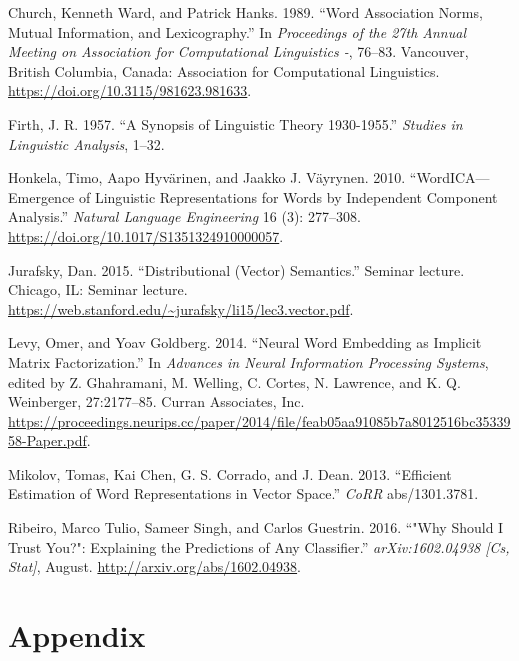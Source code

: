 \documentclass{article}
\begin{document}
\leavevmode\hypertarget{ref-church_word_1989}{}%
Church, Kenneth Ward, and Patrick Hanks. 1989. ``Word Association Norms,
Mutual Information, and Lexicography.'' In \emph{Proceedings of the 27th
Annual Meeting on Association for Computational Linguistics -}, 76--83.
Vancouver, British Columbia, Canada: Association for Computational
Linguistics. \url{https://doi.org/10.3115/981623.981633}.

\leavevmode\hypertarget{ref-firth_synopsis_1957}{}%
Firth, J. R. 1957. ``A Synopsis of Linguistic Theory 1930-1955.''
\emph{Studies in Linguistic Analysis}, 1--32.

\leavevmode\hypertarget{ref-honkela_wordicaemergence_2010}{}%
Honkela, Timo, Aapo Hyvärinen, and Jaakko J. Väyrynen. 2010.
``WordICA---Emergence of Linguistic Representations for Words by
Independent Component Analysis.'' \emph{Natural Language Engineering} 16
(3): 277--308. \url{https://doi.org/10.1017/S1351324910000057}.

\leavevmode\hypertarget{ref-jurafsky_distributional_2015}{}%
Jurafsky, Dan. 2015. ``Distributional (Vector) Semantics.'' Seminar
lecture. Chicago, IL: Seminar lecture.
\url{https://web.stanford.edu/~jurafsky/li15/lec3.vector.pdf}.

\leavevmode\hypertarget{ref-levy_neural_2014}{}%
Levy, Omer, and Yoav Goldberg. 2014. ``Neural Word Embedding as Implicit
Matrix Factorization.'' In \emph{Advances in Neural Information
Processing Systems}, edited by Z. Ghahramani, M. Welling, C. Cortes, N.
Lawrence, and K. Q. Weinberger, 27:2177--85. Curran Associates, Inc.
\url{https://proceedings.neurips.cc/paper/2014/file/feab05aa91085b7a8012516bc3533958-Paper.pdf}.

\leavevmode\hypertarget{ref-mikolov_efficient_2013}{}%
Mikolov, Tomas, Kai Chen, G. S. Corrado, and J. Dean. 2013. ``Efficient
Estimation of Word Representations in Vector Space.'' \emph{CoRR}
abs/1301.3781.

\leavevmode\hypertarget{ref-ribeiro_why_2016}{}%
Ribeiro, Marco Tulio, Sameer Singh, and Carlos Guestrin. 2016. ``"Why
Should I Trust You?": Explaining the Predictions of Any Classifier.''
\emph{arXiv:1602.04938 {[}Cs, Stat{]}}, August.
\url{http://arxiv.org/abs/1602.04938}.

\newpage

\hypertarget{appendix}{%
\section*{Appendix}\label{appendix}}
\end{document}
